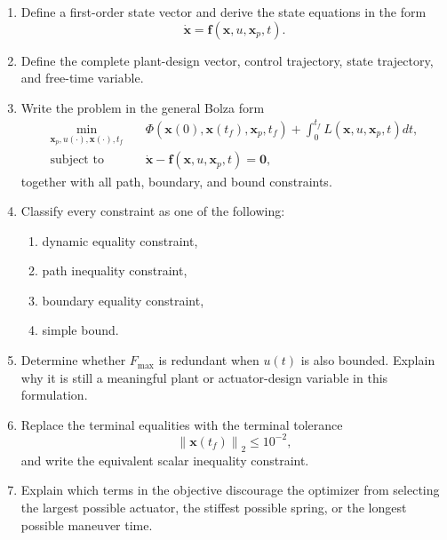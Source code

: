\begin{enumerate}
    \item Define a first-order state vector and derive the state equations
    in the form
    \begin{equation}
    \dot{\mathbf{x}}
    =
    \mathbf{f}
    \left(
    \mathbf{x},
    u,
    \mathbf{x}_p,
    t
    \right).
    \end{equation}

    \item Define the complete plant-design vector, control trajectory, state
    trajectory, and free-time variable.

    \item Write the problem in the general Bolza form
    \begin{align}
    \min_{\mathbf{x}_p,u(\cdot),\mathbf{x}(\cdot),t_f}
    \quad
    &
    \Phi
    \left(
    \mathbf{x}(0),
    \mathbf{x}(t_f),
    \mathbf{x}_p,
    t_f
    \right)
    +
    \int_0^{t_f}
    L
    \left(
    \mathbf{x},
    u,
    \mathbf{x}_p,
    t
    \right)dt,
    \\
    \text{subject to}
    \quad
    &
    \dot{\mathbf{x}}
    -
    \mathbf{f}
    \left(
    \mathbf{x},
    u,
    \mathbf{x}_p,
    t
    \right)
    =
    \mathbf{0},
    \end{align}
    together with all path, boundary, and bound constraints.

    \item Classify every constraint as one of the following:
    \begin{enumerate}
        \item dynamic equality constraint,
        \item path inequality constraint,
        \item boundary equality constraint,
        \item simple bound.
    \end{enumerate}

    \item Determine whether $F_{\max}$ is redundant when $u(t)$ is also
    bounded. Explain why it is still a meaningful plant or actuator-design
    variable in this formulation.

    \item Replace the terminal equalities with the terminal tolerance
    \begin{equation}
    \left\|
    \mathbf{x}(t_f)
    \right\|_2
    \leq 10^{-2},
    \end{equation}
    and write the equivalent scalar inequality constraint.

    \item Explain which terms in the objective discourage the optimizer from
    selecting the largest possible actuator, the stiffest possible spring,
    or the longest possible maneuver time.
\end{enumerate}


